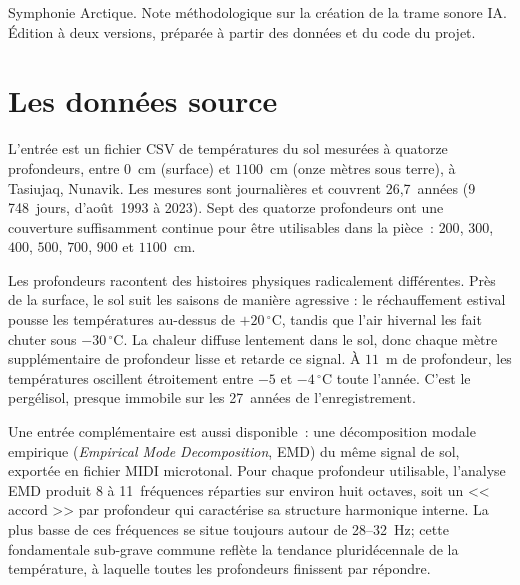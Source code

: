 \documentclass[11pt, a4paper]{article}
\begin{document}
\vfill
\begin{flushleft}
  {\sffamily\footnotesize\color{footergray}
  Symphonie Arctique. Note méthodologique sur la création de la trame sonore IA.\\
  Édition à deux versions, préparée à partir des données et du code du projet.}
\end{flushleft}

\clearpage

\thispagestyle{cover}
\vspace*{1em}
\renewcommand{\contentsname}{Table des matières}
\tableofcontents
\vfill
\clearpage

\setcounter{page}{1}

\section{Les données source}

L'entrée est un fichier CSV de températures du sol mesurées à quatorze
profondeurs, entre $0$~cm (surface) et $1100$~cm (onze mètres sous terre),
à Tasiujaq, Nunavik. Les mesures sont journalières et couvrent
26{,}7~années (9{\,}748~jours, d'août~1993 à 2023). Sept des quatorze
profondeurs ont une couverture suffisamment continue pour être utilisables
dans la pièce~: $200$, $300$, $400$, $500$, $700$, $900$ et $1100$~cm.

Les profondeurs racontent des histoires physiques radicalement différentes.
Près de la surface, le sol suit les saisons de manière agressive : le
réchauffement estival pousse les températures au-dessus de
$+20\,^{\circ}\mathrm{C}$, tandis que l'air hivernal les fait chuter sous
$-30\,^{\circ}\mathrm{C}$. La chaleur diffuse lentement dans le sol, donc
chaque mètre supplémentaire de profondeur lisse et retarde ce signal.
À $11$~m de profondeur, les températures oscillent étroitement entre
$-5$ et $-4\,^{\circ}\mathrm{C}$ toute l'année. C'est le pergélisol,
presque immobile sur les 27~années de l'enregistrement.

Une entrée complémentaire est aussi disponible~: une décomposition modale
empirique (\emph{Empirical Mode Decomposition}, EMD) du même signal de
sol, exportée en fichier MIDI microtonal. Pour chaque profondeur utilisable,
l'analyse EMD produit 8 à 11~fréquences réparties sur environ huit octaves,
soit un << accord >> par profondeur qui caractérise sa structure harmonique
interne. La plus basse de ces fréquences se situe toujours autour de
28--32~Hz; cette fondamentale sub-grave commune reflète la tendance
pluridécennale de la température, à laquelle toutes les profondeurs
finissent par répondre.
\end{document}
